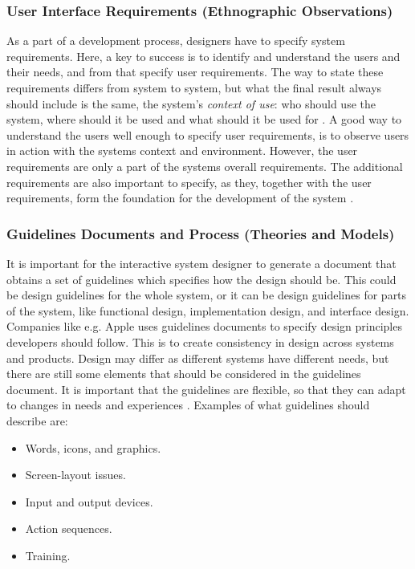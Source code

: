 \subsubsection{User Interface Requirements (Ethnographic Observations)}   
As a part of a development process, designers have to specify system requirements. Here, a key to success is to identify and understand the users and their needs, and from that specify user requirements. The way to state these requirements differs from system to system, but what the final result always should include is the same, the system's \emph{context of use}: who should use the system, where should it be used and what should it be used for \cite{mmi}. A good way to understand the users well enough to specify user requirements, is to observe users in action with the systems context and environment. However, the user requirements are only a part of the systems overall requirements. The additional requirements are also important to specify, as they, together with the user requirements, form the foundation for the development of the system \cite{mmi} \cite{systemutviklingDel1}. 

\subsubsection{Guidelines Documents and Process (Theories and Models)}
It is important for the interactive system designer to generate a document that obtains a set of guidelines which specifies how the design should be. This could be design guidelines for the whole system, or it can be design guidelines for parts of the system, like functional design, implementation design, and interface design. Companies like e.g. Apple uses guidelines documents to specify design principles developers should follow. This is to create consistency in design across systems and products. Design may differ as different systems have different needs, but there are still some elements that should be considered in the guidelines document. It is important that the guidelines are flexible, so that they can adapt to changes in needs and experiences \cite{mmi}. Examples of what guidelines should describe are:

\begin{itemize}
\renewcommand{\labelitemi}{$\bullet$}
\item Words, icons, and graphics.
\item Screen-layout issues.
\item Input and output devices.
\item Action sequences.
\item Training.
\end{itemize}

